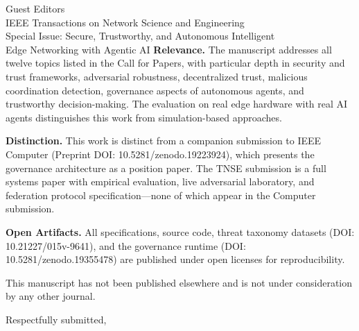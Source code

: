 \documentclass[11pt]{letter}
\begin{document}
\begin{letter}{Guest Editors\\IEEE Transactions on Network Science and Engineering\\Special Issue: Secure, Trustworthy, and Autonomous Intelligent\\Edge Networking with Agentic AI}
\textbf{Relevance.} The manuscript addresses all twelve topics listed in the Call for Papers, with particular depth in security and trust frameworks, adversarial robustness, decentralized trust, malicious coordination detection, governance aspects of autonomous agents, and trustworthy decision-making. The evaluation on real edge hardware with real AI agents distinguishes this work from simulation-based approaches.

\textbf{Distinction.} This work is distinct from a companion submission to IEEE Computer (Preprint DOI: 10.5281/zenodo.19223924), which presents the governance architecture as a position paper. The TNSE submission is a full systems paper with empirical evaluation, live adversarial laboratory, and federation protocol specification---none of which appear in the Computer submission.

\textbf{Open Artifacts.} All specifications, source code, threat taxonomy datasets (DOI: 10.21227/015v-9641), and the governance runtime (DOI: 10.5281/zenodo.19355478) are published under open licenses for reproducibility.

This manuscript has not been published elsewhere and is not under consideration by any other journal.

\closing{Respectfully submitted,}

\end{letter}
\end{document}
